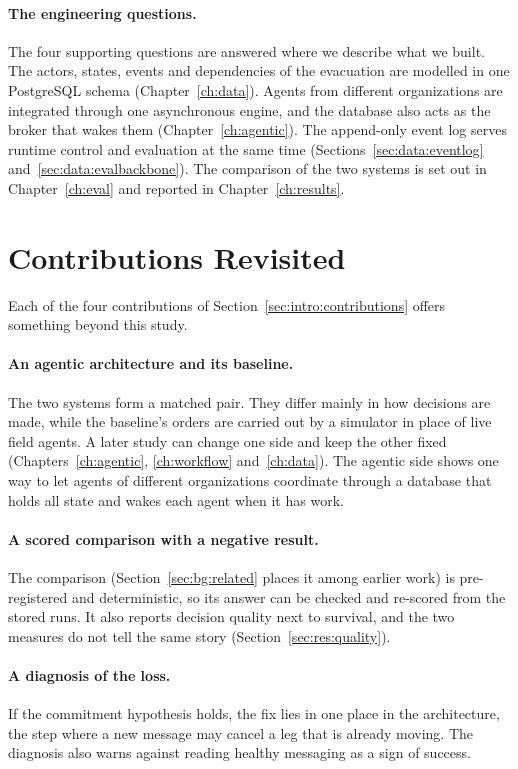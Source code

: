 \paragraph{The engineering questions.} The four supporting questions are
answered where we describe what we built. The actors, states,
events and dependencies of the evacuation are modelled in one PostgreSQL
schema (Chapter~\ref{ch:data}). Agents from different organizations are
integrated through one asynchronous engine, and the database also acts as the
broker that wakes them (Chapter~\ref{ch:agentic}). The append-only event log
serves runtime control and evaluation at the same time
(Sections~\ref{sec:data:eventlog} and~\ref{sec:data:evalbackbone}). The
comparison of the two systems is set out in Chapter~\ref{ch:eval} and
reported in Chapter~\ref{ch:results}.

\section{Contributions Revisited}
\label{sec:concl:contributions}

Each of the four contributions of Section~\ref{sec:intro:contributions} offers
something beyond this study.

\paragraph{An agentic architecture and its baseline.} The two systems form a
matched pair. They differ mainly in how decisions are made, while the
baseline's orders are carried out by a simulator in place of live field agents.
A later study can change one side and keep the other fixed (Chapters~\ref{ch:agentic},
\ref{ch:workflow} and~\ref{ch:data}). The agentic side shows one way to let
agents of different organizations coordinate through a database that holds
all state and wakes each agent when it has work.

\paragraph{A scored comparison with a negative result.} The comparison
(Section~\ref{sec:bg:related} places it among earlier work) is pre-registered
and deterministic, so its answer can be checked and re-scored from the stored
runs. It also reports decision
quality next to survival, and the two measures do not tell the same story
(Section~\ref{sec:res:quality}).

\paragraph{A diagnosis of the loss.} If the commitment hypothesis holds, the
fix lies in one place in the architecture, the step where a new message may
cancel a leg that is already moving. The diagnosis also warns against reading healthy messaging as a sign of success.

